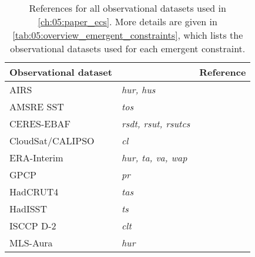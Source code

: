 \begin{table}[!b]
  \centering
  \begin{tabulary}{\columnwidth}{L >{\em}L L}
    \toprule
    Observational dataset &  &
    Reference \\
    \midrule
    AIRS & hur, hus & \textcite{Aumann2003} \\
    AMSRE \acs{SST} & tos & \textcite{AMSRE2011} \\
    CERES-EBAF & rsdt, rsut, rsutcs & \textcite{Loeb2018} \\
    CloudSat/CALIPSO & cl & \textcite{Mace2009} \\
    ERA-Interim & hur, ta, va, wap & \textcite{Dee2011} \\
    GPCP & pr & \textcite{Adler2003} \\
    HadCRUT4 & tas & \textcite{Morice2012} \\
    HadISST & ts & \textcite{Rayner2003} \\
    ISCCP D-2 & clt & \textcite{Rossow1991} \\
    MLS-Aura & hur & \textcite{Beer2006} \\
    \bottomrule
  \end{tabulary}
  \caption[
    References for all observational datasets used in \cref{ch:05:paper_ecs}.
  ]{
    References for all observational datasets used in \cref{ch:05:paper_ecs}.
    More details are given in \cref{tab:05:overview_emergent_constraints},
    which lists the observational datasets used for each emergent constraint.
  }
  \label{tab:app:a:observations}
\end{table}

